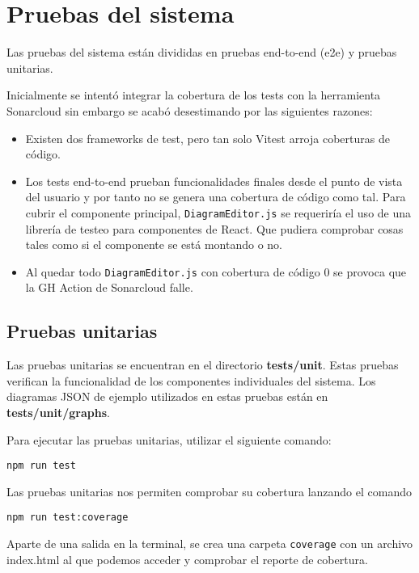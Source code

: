 \section{Pruebas del sistema}
Las pruebas del sistema están divididas en pruebas end-to-end (e2e) y pruebas unitarias.

Inicialmente se intentó integrar la cobertura de los tests con la herramienta Sonarcloud \cite{sonarcloud} sin embargo se acabó desestimando por las siguientes razones:
\begin{itemize}
    \item Existen dos frameworks de test, pero tan solo Vitest arroja coberturas de código.
    \item Los tests end-to-end prueban funcionalidades finales desde el punto de vista del usuario y por tanto no se genera una cobertura de código como tal. Para cubrir el componente principal, \texttt{DiagramEditor.js} se requeriría el uso de una librería de testeo para componentes de React. Que pudiera comprobar cosas tales como si el componente se está montando o no.
    \item Al quedar todo \texttt{DiagramEditor.js} con cobertura de código 0 se provoca que la GH Action de Sonarcloud falle.
\end{itemize}

\subsection{Pruebas unitarias}
Las pruebas unitarias se encuentran en el directorio \textbf{tests/unit}. Estas pruebas verifican la funcionalidad de los componentes individuales del sistema. Los diagramas JSON de ejemplo utilizados en estas pruebas están en \textbf{tests/unit/graphs}.

Para ejecutar las pruebas unitarias, utilizar el siguiente comando:
\begin{verbatim}
npm run test
\end{verbatim}

Las pruebas unitarias nos permiten comprobar su cobertura lanzando el comando
\begin{verbatim}
npm run test:coverage
\end{verbatim}

Aparte de una salida en la terminal, se crea una carpeta \texttt{coverage} con un archivo index.html al que podemos acceder y comprobar el reporte de cobertura.


